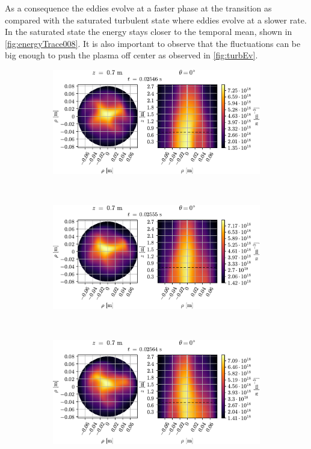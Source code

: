 As a consequence the eddies evolve at a faster phase at the transition as compared with the saturated turbulent state where eddies evolve at a slower rate.
In the saturated state the energy stays closer to the temporal mean, shown in \cref{fig:energyTrace008}.
It is also important to observe that the fluctuations can be big enough to push the plasma off center as observed in \cref{fig:turbEv}.
%
\begin{figure}[htbp]
    \centering
    \begin{subfigure}[h]{1.00\textwidth}
        \centering
        \includegraphics[width=1.0\textwidth]{fig/results/evolution/n-perpPar-2D-0}
    \end{subfigure}%
    \\
    \begin{subfigure}[h]{1.00\textwidth}
        \centering
        \includegraphics[width=1.0\textwidth]{fig/results/evolution/n-perpPar-2D-1}
    \end{subfigure}
    \\
    \begin{subfigure}[h]{1.00\textwidth}
        \centering
        \includegraphics[width=1.0\textwidth]{fig/results/evolution/n-perpPar-2D-2}

\end{subfigure}
\end{figure}
